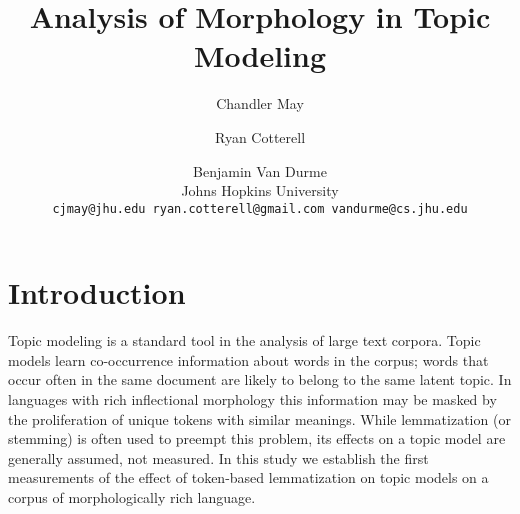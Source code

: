 \documentclass[11pt,letterpaper]{article}
\title{Analysis of Morphology in Topic Modeling}
\author{Chandler May \and Ryan Cotterell \and Benjamin Van Durme \\
    Johns Hopkins University \\
    \texttt{cjmay@jhu.edu ryan.cotterell@gmail.com
    vandurme@cs.jhu.edu}}
\date{}
\begin{document}
\maketitle

\begin{abstract}
    
\end{abstract}


\section{Introduction}\label{sec:introduction}

Topic modeling is a standard tool in the analysis of large
text corpora. Topic models learn
co-occurrence information about words in the corpus;
words that occur often in the same document are likely to belong to
the same latent topic. In languages with rich inflectional
morphology this information may be masked by the proliferation of
unique tokens with similar meanings.  While lemmatization (or stemming)
is often used to preempt this problem, its effects on a topic model are
generally assumed, not measured.  In this study we establish the first
measurements of the effect of token-based lemmatization on topic models
on a corpus of morphologically rich language.
\end{document}

